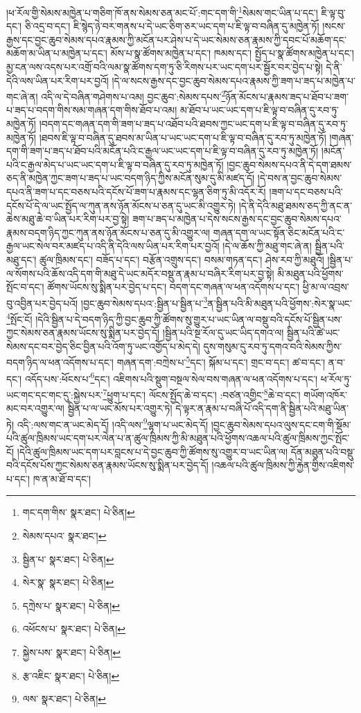 །ཕ་རོལ་གྱི་སེམས་མཁྱེན་པ་གཅིག་ཁོ་ནས་སེམས་ཅན་མང་པོ་:གང་དག་གི་\footnote{གང་དག་གིས་  སྣར་ཐང་།  པེ་ཅིན། }སེམས་གང་ཡིན་པ་དང་། ཇི་ལྟ་བུ་དང་། ཅི་འདྲ་བ་དང་། ཇི་སྙེད་ཉེ་བར་གནས་པ་དེ་ཡང་ཅིག་ཅར་ཡང་དག་པ་ཇི་ལྟ་བ་བཞིན་དུ་མཁྱེན་ཏོ། །སངས་རྒྱས་དང་བྱང་ཆུབ་སེམས་དཔའ་རྣམས་ཀྱི་མངོན་པར་ཤེས་པ་དེ་ཡང་སེམས་ཅན་རྣམས་ཀྱི་དབང་པོ་མཆོག་དང་མཆོག་མ་ཡིན་པ་མཁྱེན་པ་དང་། མོས་པ་སྣ་ཚོགས་མཁྱེན་པ་དང་། ཁམས་དང་། སྤྱོད་པ་སྣ་ཚོགས་མཁྱེན་པ་དང་། མྱ་ངན་ལས་འདས་པར་འགྲོ་བའི་ལམ་སྣ་ཚོགས་དག་ཏུ་ཅི་རིགས་པར་ཡང་དག་པར་སྦྱོར་བར་བྱེད་པ་སྟེ། དེ་ནི་དེའི་ལས་ཡིན་པར་རིག་པར་བྱའོ། །དེ་ལ་སངས་རྒྱས་དང་བྱང་ཆུབ་སེམས་དཔའ་རྣམས་ཀྱི་ཟག་པ་ཟད་པ་མཁྱེན་པ་གང་ཞེ་ན། འདི་ལ་དེ་བཞིན་གཤེགས་པ་འམ། བྱང་ཆུབ་:སེམས་དཔས་\footnote{སེམས་དཔའ་  སྣར་ཐང་། }ཉོན་མོངས་པ་རྣམས་ཟད་པ་ཐོབ་པ་ཟག་པ་ཟད་པ་བདག་གིས་སམ་གཞན་དག་གིས་ཐོབ་པ་འམ། མ་ཐོབ་པ་ཡང་ཡང་དག་པ་ཇི་ལྟ་བ་བཞིན་དུ་རབ་ཏུ་མཁྱེན་ཏོ། །བདག་དང་གཞན་དག་གི་ཟག་པ་ཟད་པ་འཐོབ་པའི་ཐབས་ཀྱང་ཡང་དག་པ་ཇི་ལྟ་བ་བཞིན་དུ་རབ་ཏུ་མཁྱེན་ཏོ། །ཐབས་ཇི་ལྟ་བ་བཞིན་དུ་ཐབས་མ་ཡིན་པ་ཡང་ཡང་དག་པ་ཇི་ལྟ་བ་བཞིན་དུ་རབ་ཏུ་མཁྱེན་ཏོ། །གཞན་དག་གི་ཟག་པ་ཟད་པ་ཐོབ་པའི་མངོན་པའི་ང་རྒྱལ་ཡང་ཡང་དག་པ་ཇི་ལྟ་བ་བཞིན་དུ་རབ་ཏུ་མཁྱེན་ཏོ། །མངོན་པའི་ང་རྒྱལ་མེད་པ་ཡང་ཡང་དག་པ་ཇི་ལྟ་བ་བཞིན་དུ་རབ་ཏུ་མཁྱེན་ཏོ། །བྱང་ཆུབ་སེམས་དཔའ་ནི་དེ་དག་ཐམས་ཅད་ནི་མཁྱེན་ཀྱང་ཟག་པ་ཟད་པ་ཡང་བདག་ཉིད་ཀྱིས་མངོན་སུམ་དུ་མི་མཛད་དོ། །དེ་བས་ན་བྱང་ཆུབ་སེམས་དཔའ་ནི་ཟག་པ་དང་བཅས་པའི་དངོས་པོ་ཟག་པ་རྣམས་དང་ལྷན་ཅིག་ཏུ་མི་འདོར་རོ། །ཟག་པ་དང་བཅས་པའི་དངོས་པོ་དེ་ལ་ཡང་སྤྱོད་ལ་ཀུན་ནས་ཉོན་མོངས་པ་ཅན་དུ་ཡང་མི་འགྱུར་ཏེ། །དེ་ནི་དེའི་མཐུ་ཐམས་ཅད་ཀྱི་ནང་ན་ཆེས་མཐུ་ཆེ་བ་ཡིན་པར་རིག་པར་བྱ་སྟེ། ཟག་པ་ཟད་པ་མཁྱེན་པ་དེས་སངས་རྒྱས་དང་བྱང་ཆུབ་སེམས་དཔའ་རྣམས་བདག་ཉིད་ཀྱང་ཀུན་ནས་ཉོན་མོངས་པ་ཅན་དུ་མི་འགྱུར་ལ། གཞན་དག་ལ་ཡང་སྟོན་ཅིང་མངོན་པའི་ང་རྒྱལ་ཡང་སེལ་བར་མཛད་པ་འདི་ནི་དེའི་ལས་ཡིན་པར་རིག་པར་བྱའོ། །དེ་ལ་ཆོས་ཀྱི་མཐུ་གང་ཞེ་ན། སྦྱིན་པའི་མཐུ་དང་། ཚུལ་ཁྲིམས་དང་། བཟོད་པ་དང་། བརྩོན་འགྲུས་དང་། བསམ་གཏན་དང་། ཤེས་རབ་ཀྱི་མཐུའོ། །སྦྱིན་པ་ལ་སོགས་པའི་ཆོས་འདི་དག་གི་མཐུ་དེ་ཡང་མདོར་བསྡུ་ན་རྣམ་པ་བཞིར་རིག་པར་བྱ་སྟེ། མི་མཐུན་པའི་ཕྱོགས་སྤོང་བ་དང་། ཚོགས་ཡོངས་སུ་སྨིན་པར་བྱེད་པ་དང་། བདག་དང་གཞན་ལ་ཕན་འདོགས་པ་དང་། ཕྱི་མ་ལ་འབྲས་བུ་འབྱིན་པར་བྱེད་པའོ། །བྱང་ཆུབ་སེམས་དཔའ་:སྦྱིན་པ་སྦྱིན་པ་\footnote{སྦྱིན་པ་  སྣར་ཐང་།  པེ་ཅིན། }ན་སྦྱིན་པའི་མི་མཐུན་པའི་ཕྱོགས་:སེར་སྣ་ཡང་\footnote{སེར་སྣ་  སྣར་ཐང་།  པེ་ཅིན། }སྤོང་ངོ། །དེའི་སྦྱིན་པ་དེ་བདག་ཉིད་ཀྱི་བྱང་ཆུབ་ཀྱི་ཚོགས་སུ་གྱུར་པ་ཡང་ཡིན་ལ་བསྡུ་བའི་དངོས་པོ་སྦྱིན་པས་ཀྱང་སེམས་ཅན་རྣམས་ཡོངས་སུ་སྨིན་པར་བྱེད་དོ། །སྦྱིན་པའི་སྔ་རོལ་དུ་ཡང་ཡིད་དགའ་ལ། སྦྱིན་པའི་ཚེ་ཡང་སེམས་དང་བར་བྱེད་ཅིང་བྱིན་པའི་འོག་ཏུ་ཡང་འགྱོད་པ་མེད་དེ། དུས་གསུམ་དུ་རབ་ཏུ་དགའ་བའི་སེམས་ཀྱིས་བདག་ཉིད་ལ་ཕན་འདོགས་པ་དང་། གཞན་དག་:བཀྲེས་པ་\footnote{དཀྲེས་པ་  སྣར་ཐང་།  པེ་ཅིན། }དང་། སྐོམ་པ་དང་། གྲང་བ་དང་། ཚ་བ་དང་། ན་བ་དང་། འདོད་པས་:ཕོངས་པ་\footnote{འཕོངས་པ་  སྣར་ཐང་།  པེ་ཅིན། }དང་། འཇིགས་པའི་སྡུག་བསྔལ་སེལ་བས་གཞན་ལ་ཕན་འདོགས་པ་དང་། ཕ་རོལ་ཏུ་ཡང་གང་དང་གང་དུ་:སྐྱེས་པར་\footnote{སྐྱེས་པས་  སྣར་ཐང་།  པེ་ཅིན། }ཕྱུག་པ་དང་། ལོངས་སྤྱོད་ཆེ་བ་དང་། :བཙན་འགྱིང་\footnote{རྩ་འཇིང་  སྣར་ཐང་།  པེ་ཅིན། }ཆེ་བ་དང་། གཡོག་འཁོར་མང་བར་འགྱུར་ལ། སྦྱིན་པ་ལ་ཡང་མོས་པར་འགྱུར་ཏེ། དེ་ལྟར་ན་རྣམ་པ་བཞི་པོ་འདི་དག་ནི་སྦྱིན་པའི་མཐུ་ཡིན་ཏེ། འདི་:ལས་གང་ན་ཡང་མེད་དོ། །འདི་ལས་\footnote{ལས་  སྣར་ཐང་།  པེ་ཅིན། }ལྷག་པ་ཡང་མེད་དོ། །བྱང་ཆུབ་སེམས་དཔའ་ལུས་དང་ངག་གི་སྡོམ་པའི་ཚུལ་ཁྲིམས་ཡང་དག་པར་ལེན་པ་ན་ཚུལ་ཁྲིམས་ཀྱི་མི་མཐུན་པའི་ཕྱོགས་འཆལ་པའི་ཚུལ་ཁྲིམས་ཀྱང་སྤོང་ངོ། །དེའི་ཚུལ་ཁྲིམས་ཡང་དག་པར་བླངས་པ་དེ་བྱང་ཆུབ་ཀྱི་ཚོགས་སུ་འགྱུར་བ་ཡང་ཡིན་ལ། དོན་མཐུན་པའི་བསྡུ་བའི་དངོས་པོས་ཀྱང་སེམས་ཅན་རྣམས་ཡོངས་སུ་སྨིན་པར་བྱེད་དོ། །འཆལ་པའི་ཚུལ་ཁྲིམས་ཀྱི་རྐྱེན་གྱིས་འཇིགས་པ་དང་། ཁ་ན་མ་ཐོ་བ་དང་། 